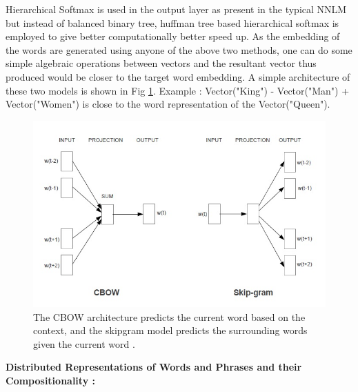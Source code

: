 Hierarchical Softmax is used in the output layer as present in the typical NNLM but instead of balanced binary tree, huffman tree based hierarchical softmax is employed to give better computationally better speed up. As the embedding of the words are generated using anyone of the above two methods, one can do some simple algebraic operations between vectors and the resultant vector thus produced would be closer to the target word embedding. A simple architecture of these two models is shown in Fig \ref{fig:word2vec}. Example : Vector("King") - Vector("Man") + Vector("Women") is close to the word representation of the Vector("Queen").
\begin{figure}[!ht]
	\centering	
	\includegraphics[scale=0.7]{snaps/word2vec.jpg}	
	\caption{The CBOW architecture predicts the current word based on the
context, and the skipgram model predicts the surrounding words given the current word \cite{word2vec}.}
\label{fig:word2vec}
\end{figure}
\begin{flushleft}
\textbf{Distributed Representations of Words and Phrases and their Compositionality \cite{word2vec2} :}
\end{flushleft}

